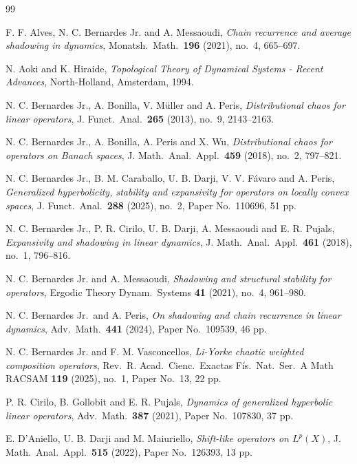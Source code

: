 \documentclass[12pt]{amsart}
\theoremstyle{theorem}
\theoremstyle{definition}
\theoremstyle{remark} \theoremstyle{question} \theoremstyle{example}
\begin{document}
\begin{thebibliography}{99}

 F. F. Alves, N. C. Bernardes Jr. and A. Messaoudi,
    {\it Chain recurrence and average shadowing in dynamics}, Monatsh.\ Math.\ {\bf 196} (2021), no.\ 4, 665--697.

 N. Aoki and K. Hiraide,
    {\it Topological Theory of Dynamical Systems - Recent Advances}, North-Holland, Amsterdam, 1994.

 N. C. Bernardes Jr., A. Bonilla, V. M\"uller and A. Peris,
    {\it Distributional chaos for linear operators}, J. Funct.\ Anal.\ {\bf 265} (2013), no.\ 9, 2143--2163.
    
 N. C. Bernardes Jr., A. Bonilla, A. Peris and X. Wu,
    {\it Distributional chaos for operators on Banach spaces}, J. Math.\ Anal.\ Appl.\ {\bf 459} (2018), no.\ 2, 797--821.

 N. C. Bernardes Jr., B. M. Caraballo, U. B. Darji, V. V. F\'avaro and A. Peris,
    {\it Generalized hyperbolicity, stability and expansivity for operators on locally convex spaces}, 
    J. Funct.\ Anal.\ {\bf 288} (2025), no.\ 2, Paper No.\ 110696, 51 pp.

 N. C. Bernardes Jr., P. R. Cirilo, U. B. Darji, A. Messaoudi and E. R. Pujals,
    {\it Expansivity and shadowing in linear dynamics}, J. Math.\ Anal.\ Appl.\ {\bf 461} (2018), no.\ 1, 796--816.

 N. C. Bernardes Jr. and A. Messaoudi,
    {\it Shadowing and structural stability for operators}, Ergodic Theory Dynam.\ Systems {\bf 41} (2021), no.\ 4, 961--980.

 N. C. Bernardes Jr.\ and A. Peris,
    {\it On shadowing and chain recurrence in linear dynamics}, Adv.\ Math.\ {\bf 441} (2024), Paper No.\ 109539, 46 pp.

 N. C. Bernardes Jr. and F. M. Vasconcellos,
    {\it Li-Yorke chaotic weighted composition operators},
    Rev.\ R. Acad.\ Cienc.\ Exactas F\'is.\ Nat.\ Ser.\ A Math RACSAM {\bf 119} (2025), no.\ 1, Paper No.\ 13, 22 pp.
    
 P. R. Cirilo, B. Gollobit and E. R. Pujals,
    {\it Dynamics of generalized hyperbolic linear operators}, Adv.\ Math.\ {\bf 387} (2021), Paper No.\ 107830, 37 pp.

 E. D'Aniello, U. B. Darji and M. Maiuriello,
    {\it Shift-like operators on $L^p(X)$}, J. Math.\ Anal.\ Appl.\ {\bf 515} (2022), Paper No.\ 126393, 13 pp.


\end{thebibliography}
\end{document}
